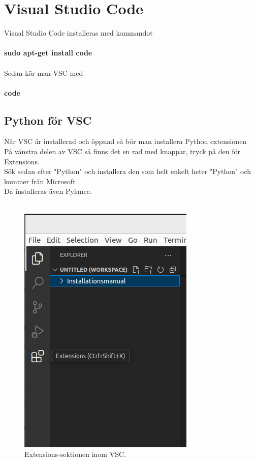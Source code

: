 \documentclass{TDP003mall}
\begin{document}
\section{Visual Studio Code}
Visual Studio Code installeras med kommandot\\\\
\textbf{sudo apt-get install code}\\\\ 
Sedan kör man VSC med\\\\
\textbf{code}
\subsection{Python för VSC}
När VSC är installerad och öppnad så bör man installera Python extensionen\\
På vänstra delen av VSC så finns det en rad med knappar, tryck på den för Extensions.\\
Sök sedan efter "Python" och installera den som helt enkelt heter "Python" och kommer från Microsoft\\
Då installeras även Pylance.\\\\
\begin{figure}[h]
  \centering
  \includegraphics[scale=0.5]{extensions}
  \caption{\label{fig:The-caption} Extensions-sektionen inom VSC.}
\end{figure}
\end{document}
